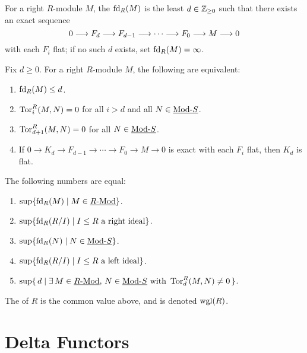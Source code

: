 
\begin{definition*}
	For a right \( R \)-module \( M \), the  \( \operatorname{fd}_R(M) \) is the least \( d\in \mathbb{Z}_{\ge 0} \) such that there exists an exact sequence
	\[
		0\longrightarrow F_d\longrightarrow F_{d-1} \longrightarrow \dotsm \longrightarrow F_0\longrightarrow M\longrightarrow 0
	\]
	with each \( F_i \) flat; if no such \( d \) exists, set \( \operatorname{fd}_R(M)=\infty \).
\end{definition*}

\begin{lemma*}
	Fix \( d \ge 0 \). For a right \( R \)-module \( M \), the following are equivalent:
	\begin{enumerate}
		\item \( \operatorname{fd}_R(M) \le d \).
		\item \( \operatorname{Tor}^R_i(M,N)=0 \) for all \( i>d \) and all \( N\in \underline{\mathrm{Mod}\text{-}S} \).
		\item \( \operatorname{Tor}^R_{d+1}(M,N)=0 \) for all \( N\in \underline{\mathrm{Mod}\text{-}S} \).
		\item If \( 0\to K_d\to F_{d-1}\to \dotsm \to F_0\to M\to 0 \) is exact with each \( F_i \) flat, then \( K_d \) is flat.
	\end{enumerate}
\end{lemma*}

\begin{theorem*}
	The following numbers are equal:
	\begin{enumerate}
		\item \( \displaystyle \sup\{\operatorname{fd}_R(M)\mid M\in \underline{R\text{-}\mathrm{Mod}}\} \).
		\item \( \displaystyle \sup\{\operatorname{fd}_R(R/I)\mid I\le R \text{ a right ideal}\} \).
		\item \( \displaystyle \sup\{\operatorname{fd}_R(N)\mid N\in \underline{\mathrm{Mod}\text{-}S}\} \).
		\item \( \displaystyle \sup\{\operatorname{fd}_R(R/I)\mid I\le R \text{ a left ideal}\} \).
		\item \( \displaystyle \sup\{\,d \mid \exists\, M\in \underline{R\text{-}\mathrm{Mod}},\,N\in \underline{\mathrm{Mod}\text{-}S}\text{ with }\operatorname{Tor}^R_d(M,N)\neq 0\,\} \).
	\end{enumerate}
\end{theorem*}

\begin{definition*}
	The  of \( R \) is the common value above, and is denoted \( \operatorname{wgl}(R) \).
\end{definition*}

\chapter{Delta Functors}

